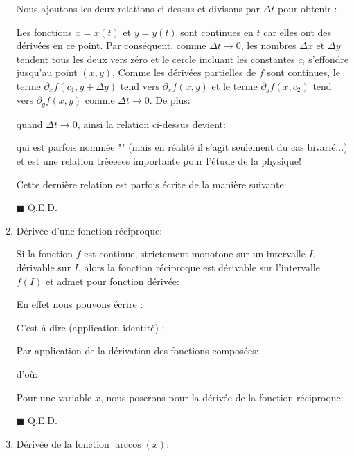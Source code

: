 \begin{enumerate}
\begin{dem}
			Nous ajoutons les deux relations ci-dessus et divisons par $\Delta t$ pour obtenir :
			
			Les fonctions $x=x(t)$ et $y=y(t)$ sont continues en $t$ car elles ont des dérivées en ce point. Par conséquent, comme $\Delta t\rightarrow 0$, les nombres $\Delta x$ et $\Delta y$ tendent tous les deux vers zéro et le cercle incluant les constantes $c_i$ s'effondre jusqu'au point $(x,y)$, Comme les dérivées partielles de $f$ sont continues, le terme $\partial_x f(c_1,y+\Delta y)$ tend vers $\partial_x f(x,y)$ et le terme $\partial_y f(x,c_2) $ tend vers $\partial_y f(x,y)$ comme $\Delta t\rightarrow 0$. De plus:
		
		quand $\Delta t\rightarrow 0$, ainsi la relation ci-dessus devient:
			
			 qui est parfois nommée "\label{multivariate chain rule}" (mais en réalité il s'agit seulement du cas bivarié...) et est une relation trèeeees importante pour l'étude de la physique!
			 
			 Cette dernière relation est parfois écrite de la manière suivante: 
			 
		 	\begin{flushright}
			$\blacksquare$  Q.E.D.
			\end{flushright}
		 \end{dem}
		 
		 \item Dérivée d'une fonction réciproque:
		 \begin{theorem}
		 	Si la fonction $f$ est continue, strictement monotone sur un intervalle $I$, dérivable sur $I$, alors la fonction réciproque est dérivable sur l'intervalle $f(I)$ et admet pour fonction dérivée:
		 	
		 \end{theorem}
		 \begin{dem}
		 	En effet nous pouvons écrire :
		 	
		 	C'est-à-dire (application identité) :
		 	
		 	Par application de la dérivation des fonctions composées:
		 	
		 	d'où:
		 	
		 	Pour une variable $x$, nous poserons pour la dérivée de la fonction réciproque:
		 	
		 	\begin{flushright}
			$\blacksquare$  Q.E.D.
			\end{flushright}
		 \end{dem}
		 \item Dérivée de la fonction $\arccos (x)$:
		 

\end{enumerate}
